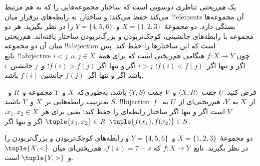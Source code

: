 \documentclass[../../../include/open-logic-section]{subfiles}
\begin{document}

\begin{explain}
یک \emph{هم‌ریختی} تناظری دوسویی است که ساختار مجموعه‌هایی را که به هم
مرتبط می‌کند حفظ می‌کند؛ و ساختار، به رابطه‌های برقرار میان~!!{element}s
آن مجموعه‌ها بستگی دارد. دو مجموعهٔ~$X=\{1,2,3\}$ و~$Y=\{4,5,6\}$ را
در نظر بگیرید. هر دو مجموعه با رابطه‌های جانشینی، کوچک‌تربودن و
بزرگ‌تربودن ساختار یافته‌اند. هم‌ریختی میان آن دو مجموعه !!a{bijection}
است که این ساختارها را حفظ کند. پس تابع~!!a{bijective} چون
$f \colon X \to Y$ هنگامی هم‌ریختی است که برای همهٔ~$i,j\in X$،
$i<j$ اگر و تنها اگر~$f(i)<f(j)$؛ $i>j$ اگر و تنها اگر
$f(i)>f(j)$؛ و~$j$ جانشین~$i$ باشد اگر و تنها اگر~$f(j)$ جانشین
$f(i)$ باشد.
\end{explain}

\begin{defn}[هم‌ریختی]
فرض کنید~$U$ جفت~$\langle X, R\rangle$ و~$V$ جفت
$\langle Y, S\rangle$ باشد، به‌طوری‌که~$X$ و~$Y$ مجموعه و~$R$ و~$S$
به‌ترتیب رابطه‌هایی بر~$X$ و~$Y$ باشند. !!{bijection}~$f$ از~$X$
به~$Y$، هم‌ریختی‌ای از~$U$ به~$V$ است اگر و تنها اگر ساختار رابطه‌ای را
حفظ کند؛ یعنی برای هر~$x_{1},x_{2}\in X$،
$\tuple{x_1,x_2} \in R$ اگر و تنها اگر
$\tuple{f(x_1),f(x_2)} \in S$.
\end{defn}

\begin{ex}
دو مجموعهٔ~$X=\{1,2,3\}$ و~$Y=\{4,5,6\}$ و رابطه‌های کوچک‌تربودن و
بزرگ‌تربودن را در نظر بگیرید. تابع~$f\colon X \to Y$ که
$f(x) = 7-x$، هم‌ریختی‌ای میان~$\tuple{X,<}$ و~$\tuple{Y,>}$ است.
\end{ex}
\end{document}
